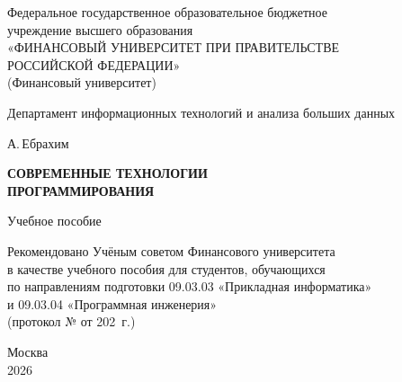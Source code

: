 \begin{titlepage}
\centering
\thispagestyle{empty}

{\normalsize
Федеральное государственное образовательное бюджетное\\
учреждение высшего образования\\
«ФИНАНСОВЫЙ УНИВЕРСИТЕТ ПРИ ПРАВИТЕЛЬСТВЕ\\
РОССИЙСКОЙ ФЕДЕРАЦИИ»\\
(Финансовый университет)
\par}

\vspace{12mm}

{\normalsize Департамент %
информационных технологий и анализа больших данных\par}

\vspace{28mm}

{\large %
А.\,Ебрахим\par}

\vspace{18mm}

{\LARGE\bfseries СОВРЕМЕННЫЕ ТЕХНОЛОГИИ\\[4pt] ПРОГРАММИРОВАНИЯ\par}

\vspace{10mm}

{\Large Учебное пособие\par}

\vspace{22mm}

{\normalsize
Рекомендовано Учёным советом Финансового университета\\
в качестве учебного пособия для студентов, обучающихся\\
по направлениям подготовки 09.03.03 «Прикладная информатика»\\
и 09.03.04 «Программная инженерия»\\[6pt]
(протокол № \underline{\hspace{12mm}} от \underline{\hspace{22mm}} 202\underline{\hspace{4mm}}~г.)
\par}

\vfill

{\normalsize Москва\\ 2026\par}

\end{titlepage}
